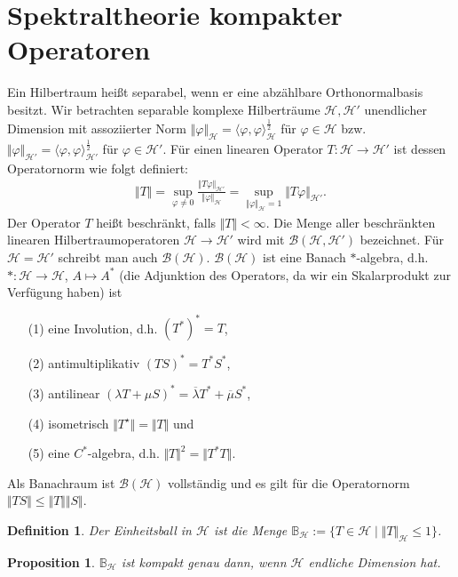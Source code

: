 \documentclass[11pt, hidelinks]{article}
\newcommand{\h}{\mathcal{H}}
\newcommand{\B}{\mathcal{B}}
\numberwithin{conj}{section}
\newtheorem{definition}[conj]{Definition}
\newtheorem{proposition}[conj]{Proposition}
\begin{document}
\section{Spektraltheorie kompakter Operatoren}
Ein Hilbertraum heißt separabel, wenn er eine abzählbare Orthonormalbasis besitzt. Wir betrachten separable komplexe Hilberträume $\h, \h'$ unendlicher Dimension mit assoziierter Norm $\Vert \varphi \Vert_{\h} = \langle \varphi, \varphi \rangle^{\frac{1}{2}}_{\h}$ für $\varphi \in \h$ bzw. $\Vert \varphi \Vert_{\h'} = \langle \varphi, \varphi \rangle^{\frac{1}{2}}_{\h'}$ für $\varphi \in \h'$. Für einen linearen Operator $T: \h \rightarrow \h'$ ist dessen Operatornorm wie folgt definiert:
\begin{align}
    \Vert T \Vert = \sup_{\varphi \neq 0} \frac{\Vert T\varphi \Vert_{\h'}}{\Vert\varphi\Vert_\h} = \sup_{\Vert\varphi\Vert_\h = 1} \Vert T\varphi\Vert_{\h'}.
\end{align}
Der Operator $T$ heißt beschränkt, falls $\Vert T \Vert < \infty$. Die Menge aller beschränkten linearen Hilbertraumoperatoren $\h \to \h'$ wird mit $\B(\h,\h')$ bezeichnet. Für $\h = \h'$ schreibt man auch $\B(\h)$. $\B(\h)$ ist eine Banach $\ast$-algebra, d.h. $\ast: \h \to \h$, $A \mapsto A^\ast$ (die Adjunktion des Operators, da wir ein Skalarprodukt zur Verfügung haben) ist 
\begin{enumerate}
    \item[(1)] eine Involution, d.h. $(T^\ast)^\ast = T$,
    \item[(2)] antimultiplikativ $(TS)^\ast = T^\ast S^\ast$,
    \item[(3)] antilinear $(\lambda T + \mu S)^\ast = \overline{\lambda} T^\ast + \overline{\mu} S^\ast$, 
    \item[(4)] isometrisch $\Vert T^\star \Vert = \Vert T \Vert$ und
    \item[(5)] eine $C^\ast$-algebra, d.h. $\Vert T \Vert^2 = \Vert T^\ast T \Vert$.
\end{enumerate}
Als Banachraum ist $\B(\h)$ vollständig und es gilt für die Operatornorm $\Vert TS  \Vert \leq \Vert T \Vert \Vert S \Vert$.

\begin{definition}
    Der Einheitsball in $\h$ ist die Menge $\mathbb{B}_\h := \{ T \in \h \; \vert \; \Vert T \Vert_\h \leq 1 \}$.
\end{definition}

\begin{proposition}
    $\mathbb{B}_\h$ ist kompakt genau dann, wenn $\h$ endliche Dimension hat.
\end{proposition}
\end{document}
